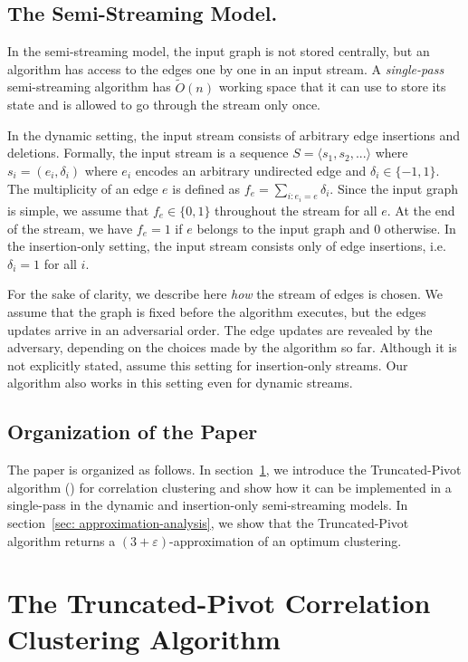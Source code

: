 \documentclass[10pt,a4paper]{article}
\newcommand{\truncatedpivot}{\textrm{Truncated-Pivot}\xspace}
\newcommand{\eps}{\ensuremath{\varepsilon}}
\begin{document}
\subsection{The Semi-Streaming Model.}\label{sec: model}
In the semi-streaming model, the input graph is not stored centrally, but an algorithm has access to the edges one by one in an input stream. A \emph{single-pass} semi-streaming algorithm has $\widetilde{O}(n)$ working space that it can use to store its state and is allowed to go through the stream only once. 

In the dynamic setting, the input stream consists of arbitrary edge insertions and deletions. Formally, the input
stream is a sequence $S = \langle s_1, s_2, . . .\rangle$ where $s_i = (e_i, \delta_i)$
where $e_i$ encodes an arbitrary undirected edge and $\delta_i \in \{-1, 1\}$. The multiplicity of an edge $e$ is defined as $f_e = \sum_{i:e_i=e} \delta_i$. Since the input graph is simple, we assume that $f_e \in \{0, 1\}$ throughout the stream for all $e$. 
At the end of the stream, we have $f_e = 1$ if $e$ belongs to the input graph and $0$ otherwise. 
In the insertion-only setting, the input stream consists only of edge insertions, i.e. $\delta_i = 1$ for all $i$. 

For the sake of clarity, we describe here \emph{how} the stream of edges is chosen. We assume that the graph is fixed before the algorithm executes, but the edges updates arrive in an adversarial order. The edge updates are revealed by the adversary, depending on the choices made by the algorithm so far. Although it is not explicitly stated, \cite{behnezhad2023single,chakrabarty2023singlepass} assume this setting for insertion-only streams. Our algorithm also works in this setting even for dynamic streams.


\subsection*{Organization of the Paper}
 The paper is organized as follows.
In section~\ref{sec: truncated-pivot}, we introduce the \truncatedpivot algorithm () for correlation clustering and show how it can be implemented in a single-pass in the dynamic and insertion-only semi-streaming models.
In section~\ref{sec: approximation-analysis}, we show that the \truncatedpivot algorithm returns a $(3+\eps)$-approximation of an optimum clustering. 



\section{The \truncatedpivot Correlation Clustering Algorithm}\label{sec: truncated-pivot}
\end{document}
